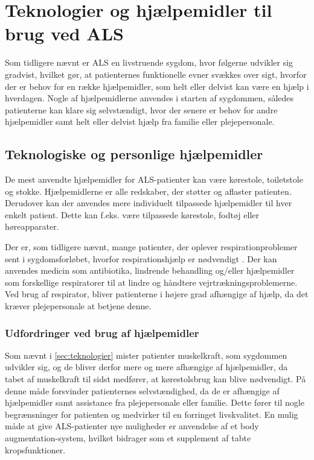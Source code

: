 \section{Teknologier og hjælpemidler til brug ved ALS} \label{sec:teknologier}
Som tidligere nævnt er ALS en livstruende sygdom, hvor følgerne udvikler sig gradvist, hvilket gør, at patienternes funktionelle evner svækkes over sigt, hvorfor der er behov for en række hjælpemidler, som helt eller delvist kan være en hjælp i hverdagen. Nogle af hjælpemidlerne anvendes i starten af sygdommen, således patienterne kan klare sig selvstændigt, hvor der senere er behov for andre hjælpemidler samt helt eller delvist hjælp fra familie eller plejepersonale. \citep{brandt2010}

\subsection{Teknologiske og personlige hjælpemidler}
De mest anvendte hjælpemidler for ALS-patienter kan være kørestole, toiletstole og stokke. Hjælpemidlerne er alle redskaber, der støtter og aflaster patienten. Derudover kan der anvendes mere individuelt tilpassede hjælpemidler til hver enkelt patient. Dette kan f.eks. være tilpassede kørestole, fodtøj eller høreapparater. \citep{brandt2010}

Der er, som tidligere nævnt, mange patienter, der oplever respirationproblemer sent i sygdomsforløbet, hvorfor respirationshjælp er nødvendigt \citep{hefferman2006}. Der kan anvendes medicin som antibiotika, lindrende behandling og/eller hjælpemidler som forskellige respiratorer til at lindre og håndtere vejrtrækningsproblemerne. Ved brug af respirator, bliver patienterne i højere grad afhængige af hjælp, da det kræver plejepersonale at betjene denne. \citep{rcfm2001}

\subsubsection{Udfordringer ved brug af hjælpemidler}
Som nævnt i \autoref{sec:teknologier} mister patienter muskelkraft, som sygdommen udvikler sig, og de bliver derfor mere og mere afhængige af hjælpemidler, da tabet af muskelkraft til sidst medfører, at kørestolsbrug kan blive nødvendigt. På denne måde forsvinder patienternes selvstændighed, da de er afhængige af hjælpemidler samt assistance fra plejepersonale eller familie. \citep{brandt2010} Dette fører til nogle begrænsninger for patienten og medvirker til en forringet livskvalitet. En mulig måde at give ALS-patienter nye muligheder er anvendelse af et body augmentation-system, hvilket bidrager som et supplement af tabte kropsfunktioner. \citep{erlen2003} 

